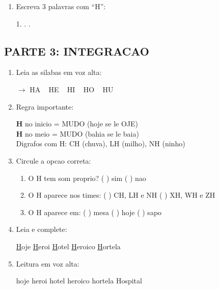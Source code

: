 \begin{exercicio}
\begin{enumerate}[resume]
  \item Escreva 3 palavras com ``H'':
  \begin{center}
  1. \underline{\hspace{4cm}} . \underline{\hspace{4cm}} . \underline{\hspace{4cm}}
  \end{center}
\end{enumerate}

\subsection*{PARTE 3: INTEGRACAO}

\begin{enumerate}[resume]
  \item Leia as silabas em voz alta:
  \begin{center}
  $\rightarrow$ HA  ~  HE  ~  HI  ~  HO  ~  HU
  \end{center}

  \item Regra importante:
  \begin{center}
  \textbf{H} no inicio = MUDO (hoje se le OJE)\\
  \textbf{H} no meio = MUDO (bahia se le baia)\\
  Digrafos com H: CH (chuva), LH (milho), NH (ninho)
  \end{center}

  \item Circule a opcao correta:
  \begin{enumerate}[label=(\alph*)]
    \item O H tem som proprio? ( ) sim ( ) nao
    \item O H aparece nos times: ( ) CH, LH e NH ( ) XH, WH e ZH
    \item O H aparece em: ( ) mesa ( ) hoje ( ) sapo
  \end{enumerate}

  \item Leia e complete:
  \begin{center}
  \underline{H}oje \quad \underline{H}eroi \quad \underline{H}otel \quad \underline{H}eroico \quad \underline{H}ortela
  \end{center}

  \item Leitura em voz alta:
  \begin{center}
  hoje \quad heroi \quad hotel \quad heroico \quad hortela \quad Hospital
  \end{center}
\end{enumerate}
\end{exercicio}

